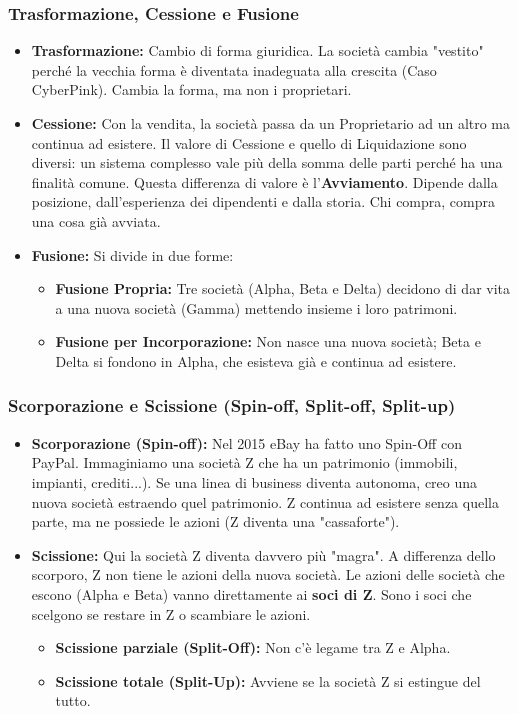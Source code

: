 \documentclass[a4paper,12pt]{article}
\begin{document}
	\subsubsection{Trasformazione, Cessione e Fusione}
	\begin{itemize}
		\item \textbf{Trasformazione:} Cambio di forma giuridica. La società cambia "vestito" perché la vecchia forma è diventata inadeguata alla crescita (Caso CyberPink). Cambia la forma, ma non i proprietari.
		\item \textbf{Cessione:} Con la vendita, la società passa da un Proprietario ad un altro ma continua ad esistere. Il valore di Cessione e quello di Liquidazione sono diversi: un sistema complesso vale più della somma delle parti perché ha una finalità comune. Questa differenza di valore è l'\textbf{Avviamento}. Dipende dalla posizione, dall'esperienza dei dipendenti e dalla storia. Chi compra, compra una cosa già avviata.
		\item \textbf{Fusione:} Si divide in due forme:
		\begin{itemize}
			\item \textbf{Fusione Propria:} Tre società (Alpha, Beta e Delta) decidono di dar vita a una nuova società (Gamma) mettendo insieme i loro patrimoni.
			\item \textbf{Fusione per Incorporazione:} Non nasce una nuova società; Beta e Delta si fondono in Alpha, che esisteva già e continua ad esistere.
		\end{itemize}
	\end{itemize}
	
	\subsubsection{Scorporazione e Scissione (Spin-off, Split-off, Split-up)}
	\begin{itemize}
		\item \textbf{Scorporazione (Spin-off):} Nel 2015 eBay ha fatto uno Spin-Off con PayPal. Immaginiamo una società Z che ha un patrimonio (immobili, impianti, crediti...). Se una linea di business diventa autonoma, creo una nuova società estraendo quel patrimonio. Z continua ad esistere senza quella parte, ma ne possiede le azioni (Z diventa una "cassaforte").
		\item \textbf{Scissione:} Qui la società Z diventa davvero più "magra". A differenza dello scorporo, Z non tiene le azioni della nuova società. Le azioni delle società che escono (Alpha e Beta) vanno direttamente ai \textbf{soci di Z}. Sono i soci che scelgono se restare in Z o scambiare le azioni.
		\begin{itemize}
			\item \textbf{Scissione parziale (Split-Off):} Non c'è legame tra Z e Alpha.
			\item \textbf{Scissione totale (Split-Up):} Avviene se la società Z si estingue del tutto.
		\end{itemize}
	\end{itemize}
	
\end{document}
